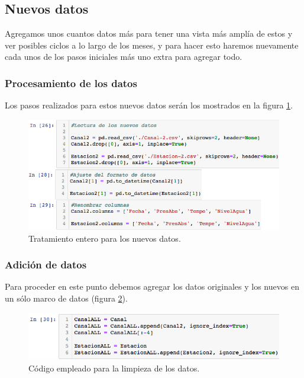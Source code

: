 \documentclass[12pt]{article}
\begin{document}
\subsection{Nuevos datos}

\noindent Agregamos unos cuantos datos más para tener una vista más amplía de estos y ver posibles ciclos a lo largo de los meses, y para hacer esto haremos nuevamente cada unos de los pasos iniciales más uno extra para agregar todo.

\subsubsection{Procesamiento de los datos}

\noindent Los pasos realizados para estos nuevos datos serán los mostrados en la figura \ref{fig:procesamiento}.

\begin{figure}[h!]
	\center
	\includegraphics[scale=.6]{./Images/procesamiento}
	\caption{\label{fig:procesamiento} Tratamiento entero para los nuevos datos.}
\end{figure}

\subsubsection{Adición de datos}

\noindent Para proceder en este punto debemos agregar los datos originales y los nuevos en un sólo marco de datos (figura \ref{fig:suma}).

\begin{figure}[h!]
	\center
	\includegraphics[scale=.6]{./Images/sumadf}
	\caption{\label{fig:suma} Código empleado para la limpieza de los datos.}
\end{figure}
\end{document}
